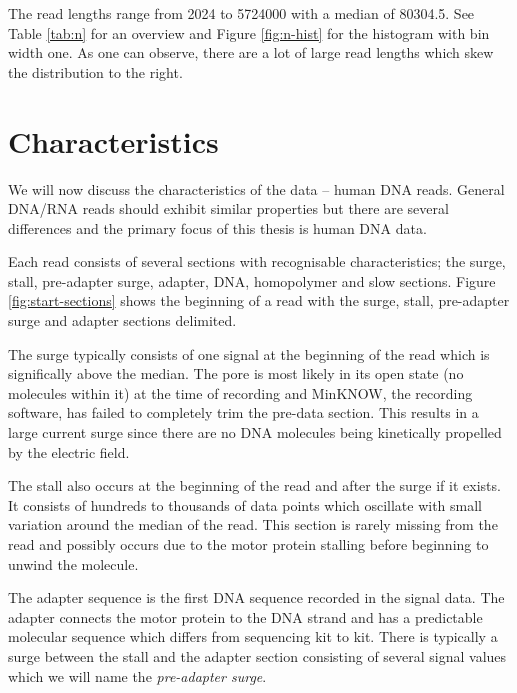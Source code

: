 


The read lengths range from 2024 to \num{5724000} with a median of 80304.5. See Table \ref{tab:n} for an overview and Figure \ref{fig:n-hist} for the histogram with bin width one. As one can observe, there are a lot of large read lengths which skew the distribution to the right.




\section{Characteristics}
\label{sec:data:char}

We will now discuss the characteristics of the data -- human DNA reads. General DNA/RNA reads should exhibit similar properties but there are several differences and the primary focus of this thesis is human DNA data.

Each read consists of several sections with recognisable characteristics; the surge, stall, pre-adapter surge, adapter, DNA, homopolymer and slow sections. Figure \ref{fig:start-sections} shows the beginning of a read with the surge, stall, pre-adapter surge and adapter sections delimited.

The surge typically consists of one signal at the beginning of the read which is significally above the median. The pore is most likely in its open state (no molecules within it) at the time of recording and MinKNOW, the recording software, has failed to completely trim the pre-data section. This results in a large current surge since there are no DNA molecules being kinetically propelled by the electric field.

The stall also occurs at the beginning of the read and after the surge if it exists. It consists of hundreds to thousands of data points which oscillate with small variation around the median of the read. This section is rarely missing from the read and possibly occurs due to the motor protein stalling before beginning to unwind the molecule.

The adapter sequence is the first DNA sequence recorded in the signal data. The adapter connects the motor protein to the DNA strand and has a predictable molecular sequence which differs from sequencing kit to kit. There is typically a surge between the stall and the adapter section consisting of several signal values which we will name the \textit{pre-adapter surge}.

